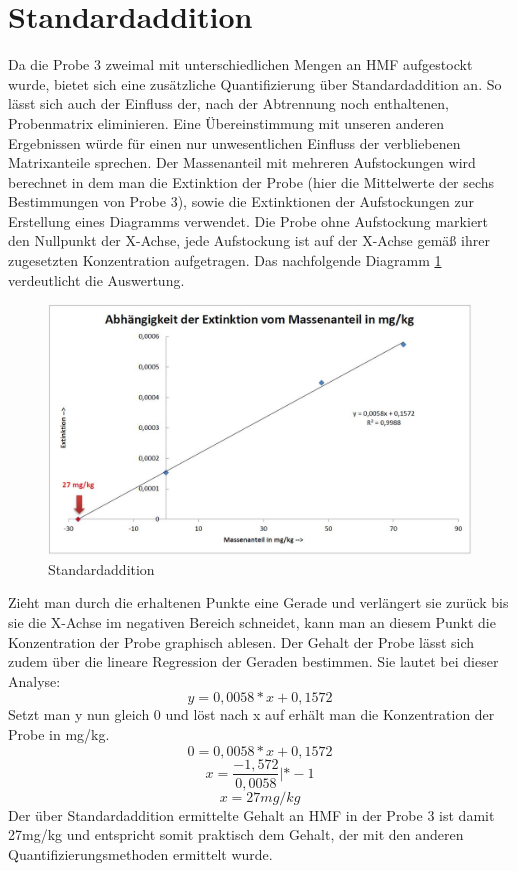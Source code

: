 \section{Standardaddition}
Da die Probe 3 zweimal mit unterschiedlichen Mengen an HMF aufgestockt wurde, bietet sich eine zusätzliche Quantifizierung über Standardaddition an. So lässt sich auch der Einfluss der, nach der Abtrennung noch enthaltenen, Probenmatrix eliminieren. Eine Übereinstimmung mit unseren anderen Ergebnissen würde für einen nur unwesentlichen Einfluss der verbliebenen Matrixanteile sprechen. Der Massenanteil mit mehreren Aufstockungen wird berechnet in dem man die Extinktion der Probe (hier die Mittelwerte der sechs Bestimmungen von Probe 3), sowie die Extinktionen der Aufstockungen zur Erstellung eines Diagramms verwendet. Die Probe ohne Aufstockung markiert den Nullpunkt der X-Achse, jede Aufstockung ist auf der X-Achse gemäß ihrer zugesetzten Konzentration aufgetragen. Das nachfolgende Diagramm \ref{fig:Standardaddidtion} verdeutlicht die Auswertung. 
\begin{figure}[htbp]
	\centering
		\includegraphics[width=1.00\textwidth]{../Bilder/Standardaddidtion.JPG}
	\caption{Standardaddition}
	\label{fig:Standardaddidtion}
\end{figure}


Zieht man durch die erhaltenen Punkte eine Gerade und verlängert sie zurück bis sie die X-Achse im negativen Bereich schneidet, kann man an diesem Punkt die Konzentration der Probe graphisch ablesen. Der Gehalt der Probe lässt sich zudem über die lineare Regression der Geraden bestimmen. Sie lautet bei dieser Analyse:
	\[y=0,0058*x+0,1572\] 
Setzt man y nun gleich 0 und löst nach x auf erhält man die Konzentration der Probe in mg/kg.
 	\[0=0,0058*x+0,1572\] 
	\[x=\frac{ -1,572 }{ 0,0058 }   |*-1\] 
	\[x=27mg/kg\] 
Der über Standardaddition ermittelte Gehalt an HMF in der Probe 3 ist damit 27mg/kg und entspricht somit praktisch dem Gehalt, der mit den anderen Quantifizierungsmethoden ermittelt wurde.